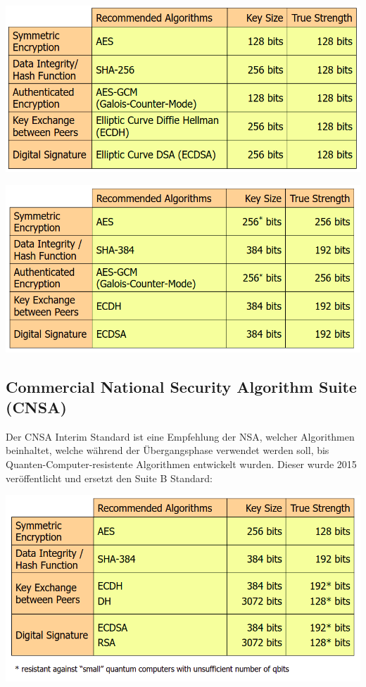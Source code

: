 \begin{minipage}[t]{1\textwidth}
\centering
	\includegraphics[width=0.8\linewidth]{images/suite-b-128.png}
\end{minipage}

\begin{minipage}[t]{1\textwidth}
\centering
	\includegraphics[width=0.8\linewidth]{images/suite-b-192.png}
\end{minipage}

\subsection{Commercial National Security Algorithm Suite (CNSA)}
Der CNSA Interim Standard ist eine Empfehlung der NSA, welcher Algorithmen beinhaltet, welche während der Übergangsphase verwendet werden soll, bis Quanten-Computer-resistente Algorithmen entwickelt wurden. Dieser wurde 2015 veröffentlicht und ersetzt den Suite B Standard:
\begin{minipage}[t]{1\textwidth}
\centering
	\includegraphics[width=0.8\linewidth]{images/cnsa-standard.png}
\end{minipage}



